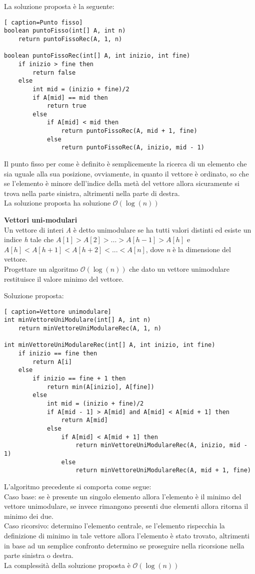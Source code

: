 \documentclass[../cheatSheetAlgoritmi.tex]{subfiles}
\begin{document}
\bigskip
La soluzione proposta è la seguente:
\newpage

\begin{lstlisting}[ caption=Punto fisso]
boolean puntoFisso(int[] A, int n)
	return puntoFissoRec(A, 1, n)

boolean puntoFissoRec(int[] A, int inizio, int fine)
	if inizio > fine then
    	return false
  	else
    	int mid = (inizio + fine)/2
    	if A[mid] == mid then
      		return true
    	else
      		if A[mid] < mid then
        		return puntoFissoRec(A, mid + 1, fine)
      		else
        		return puntoFissoRec(A, inizio, mid - 1)
\end{lstlisting}
Il punto fisso per come è definito è semplicemente la ricerca di un elemento che sia uguale alla sua posizione, ovviamente, in quanto il vettore è ordinato, so che se l'elemento è minore dell'indice della metà del vettore allora sicuramente si trova nella parte sinistra, altrimenti nella parte di destra. \\
La soluzione proposta ha soluzione $\mathcal{O}(\log(n))$

\bigskip
\textbf{Vettori uni-modulari} \\
Un vettore di interi \textit{A} è detto unimodulare se ha tutti valori distinti ed esiste un indice \textit{h} tale che $ A[1] > A[2] > ... > A[h-1] > A[h] $ e $A[h] < A[h+1] < A[h+2] < ... < A[n]$, dove \textit{n} è la dimensione del vettore.\\ Progettare un algoritmo $\mathcal{O}(\log(n))$ che dato un vettore unimodulare restituisce il valore minimo del vettore.

\bigskip
Soluzione proposta:
\begin{lstlisting}[ caption=Vettore unimodulare]
int minVettoreUniModulare(int[] A, int n)
	return minVettoreUniModulareRec(A, 1, n)
	
int minVettoreUniModulareRec(int[] A, int inizio, int fine)
	if inizio == fine then
    	return A[i]
  	else
    	if inizio == fine + 1 then
      		return min(A[inizio], A[fine])
    	else
      		int mid = (inizio + fine)/2 
      		if A[mid - 1] > A[mid] and A[mid] < A[mid + 1] then
        		return A[mid]
      		else
        		if A[mid] < A[mid + 1] then
          			return minVettoreUniModulareRec(A, inizio, mid - 1)
        		else
          			return minVettoreUniModulareRec(A, mid + 1, fine)
\end{lstlisting}
L'algoritmo precedente si comporta come segue: \\
Caso base: 
se è presente un singolo elemento allora l'elemento è il minimo del vettore unimodulare, se invece rimangono presenti due elementi allora ritorna il minimo dei due. \\
Caso ricorsivo: determino l'elemento centrale, se l'elemento rispecchia la definizione di minimo in tale vettore allora l'elemento è stato trovato, altrimenti in base ad un semplice confronto determino se proseguire nella ricorsione nella parte sinistra o destra. \\
La complessità della soluzione proposta è $\mathcal{O}(\log(n))$
\end{document}
